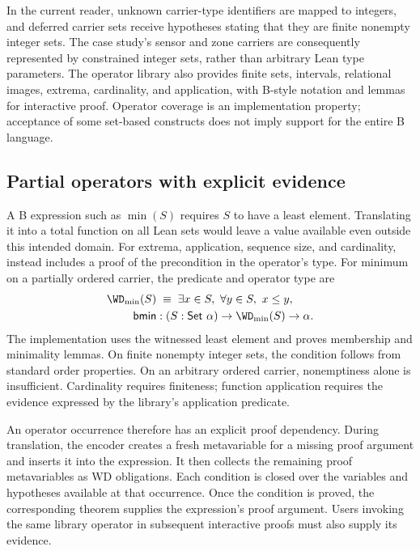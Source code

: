 In the current reader, unknown carrier-type identifiers are mapped to
integers, and deferred carrier sets receive hypotheses stating that
they are finite nonempty integer sets. The case study's sensor and zone
carriers are consequently represented by constrained integer sets,
rather than arbitrary Lean type parameters. The operator library also
provides finite sets, intervals, relational images, extrema, cardinality,
and application, with B-style notation and lemmas for interactive proof.
Operator coverage is an implementation property; acceptance of some
set-based constructs does not imply support for the entire B language.

\subsection{Partial operators with explicit evidence}

A B expression such as $\min(S)$ requires $S$ to have a least element.
Translating it into a total function on all Lean sets would leave a value
available even outside this intended domain. For extrema, application,
sequence size, and cardinality, \barrel instead includes a proof of the
precondition in the operator's type. For minimum on a partially ordered
carrier, the predicate and operator type are
\begin{align*}
  \WD_{\min}(S)&\;\equiv\;
    \exists x\in S,\ \forall y\in S,\ x\leq y,\\
  \mathsf{bmin}&:(S:\mathsf{Set}\ \alpha)\to
    \WD_{\min}(S)\to\alpha.
\end{align*}
The implementation uses the witnessed least element and proves membership
and minimality lemmas. On finite nonempty integer sets, the condition
follows from standard order properties. On an arbitrary ordered carrier,
nonemptiness alone is insufficient. Cardinality requires finiteness;
function application requires the evidence expressed by the library's
application predicate.

An operator occurrence therefore has an explicit proof dependency. During
translation, the encoder creates a fresh metavariable for a missing
proof argument and inserts it into the expression. It then collects the
remaining proof metavariables as WD obligations. Each condition is closed
over the variables and hypotheses available at that occurrence. Once the
condition is proved, the corresponding theorem supplies the expression's
proof argument. Users invoking the same library operator in subsequent
interactive proofs must also supply its evidence.

